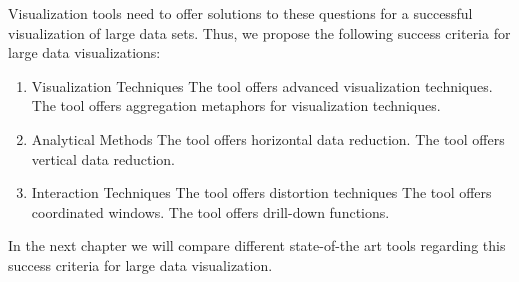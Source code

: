 Visualization tools need to offer solutions to these questions for a successful visualization of large data sets. Thus, we propose the following success criteria for large data visualizations: 
\begin{enumerate}
\item Visualization Techniques
\subitem The tool offers advanced visualization techniques.
\subitem The tool offers aggregation metaphors for visualization techniques.
\item Analytical Methods
\subitem The tool offers horizontal data reduction.
\subitem The tool offers vertical data reduction.
\item Interaction Techniques
\subitem The tool offers distortion techniques
\subitem The tool offers coordinated windows.
\subitem The tool offers drill-down functions.
\end{enumerate}

In the next chapter we will compare different state-of-the art tools regarding this success criteria for large data visualization.
